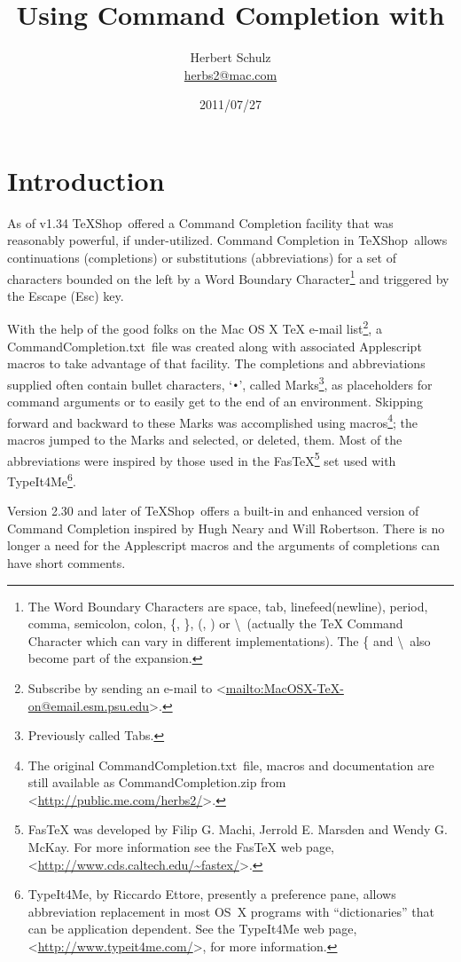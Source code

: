 \documentclass[11pt]{article}
\title{Using Command Completion with \\ \TS}
\author{Herbert Schulz\\\small\href{mailto:herbs2@mac.com}{herbs2@mac.com}}
\date{2011/07/27}
\newcommand{\esckey}{\textsf{Esc}}
\newcommand{\fastex}{Fas\hspace{-.15em}\TeX}
\newcommand{\TS}{\textsf{\TeX Shop}}
\newcommand{\CCT}{\textsf{CommandCompletion.txt}}
\begin{document}
\maketitle
\thispagestyle{empty}

\section*{Introduction}

As of v1.34 \TS\ offered a Command Completion facility that was reasonably powerful, if under-utilized. Command Completion in \TS\ allows continuations (completions) or substitutions (abbreviations) for a set of characters bounded on the left by a \textsf{Word Boundary Character}\footnote{The \textsf{Word Boundary Characters} are space, tab, linefeed(newline), period, comma, semicolon, colon, \{, \}, (, ) or \textbackslash\ (actually the \textsf{TeX Command Character} which can vary in different implementations). The \{ and \textbackslash\ also become part of the expansion.} and triggered by the Escape (\esckey) key.

With the help of the good folks on the \textsf{Mac OS X TeX} e-mail list\footnote{Subscribe by sending an e-mail to <\url{mailto:MacOSX-TeX-on@email.esm.psu.edu}>.}, a \CCT\ file was created along with associated Applescript macros to take advantage of that facility. The completions and abbreviations supplied often contain bullet characters, `\texttt{•}', called Marks\footnote{Previously called Tabs.}, as placeholders for command arguments or to easily get to the end of an environment. Skipping forward and backward to these Marks was accomplished using macros\footnote{The original \CCT\ file, macros and documentation are still available as \textsf{CommandCompletion.zip} from  <\url{http://public.me.com/herbs2/}>.}; the macros jumped to the Marks and selected, or deleted, them. Most of the abbreviations were inspired by those used in the \textsf{\fastex}\footnote{\textsf{\fastex} was developed by Filip G. Machi, Jerrold E. Marsden and Wendy G. McKay. For more information see the \textsf{\fastex} web page, <\url{http://www.cds.caltech.edu/~fastex/}>.} set used with \textsf{TypeIt4Me}\footnote{\textsf{TypeIt4Me}, by Riccardo Ettore, presently a preference pane, allows abbreviation replacement in most OS~X programs with ``dictionaries'' that can be application dependent. See the \textsf{TypeIt4Me} web page, <\url{http://www.typeit4me.com/}>, for more information.}.

Version 2.30 and later of \TS\ offers a built-in and enhanced version of Command Completion inspired by Hugh Neary and Will Robertson. There is no longer a need for the Applescript macros and the arguments of completions can have short comments.
\end{document}
